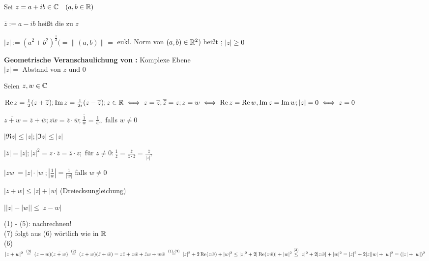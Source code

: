 \documentclass[a4paper,twoside,DIV15,BCOR12mm]{scrbook}
\begin{document}
\begin{definition}
Sei $z = a + ib \in \mathbb{C} \quad (a,b \in \mathbb{R})$\\
\begin{liste}
\item $\bar z := a - ib$ heißt die zu $z$  \\
\item $|z| := (a^2 + b^2)^{\frac{1}{2}} (=\|(a,b)\| =$ eukl. Norm von $(a,b) \in \mathbb{R} ^2$) heißt ; $|z|\geq 0$
\end{liste}
\textbf{Geometrische Veranschaulichung von \MdC :} Komplexe Ebene \\
$|z| =$ Abstand von $z$ und $0$
\end{definition}

\begin{satz}
Seien $z,w \in \mathbb{C}$\\
\begin{liste}
\item $\mathop{\rm Re}\nolimits z = \frac{1}{2}(z + \overline{z}); \mathop{\rm Im}\nolimits z = \frac{1}{2 i}(z-\overline{z}); z \in \mathbb{R} \iff z = \overline{z}; \overline{\bar z}=z; z=w \iff \mathop{\rm Re}\nolimits z = \mathop{\rm Re}\nolimits w, \mathop{\rm Im}\nolimits z = \mathop{\rm Im}\nolimits w; |z|=0 \iff z=0$
\item $\overline{z+w} = \overline{z} + \overline{w}; \overline{zw} = \overline{z} \cdot \overline{w}; \overline{\frac{1}{w}} = \frac{1}{\bar w}, $ falls $w \neq 0$
\item $| \Re z| \leq |z|; |\Im z| \leq |z|$
\item $|\bar z| = |z|; |z|^2 = z\cdot \bar z = \bar z \cdot z;$ für $z \neq 0 : \frac{1}{z} = \frac{\overline{z}}{z \cdot \overline{z}} = \frac{\overline{z} }{|z|^2}$
\item $|zw| = |z|\cdot |w|; |\frac{1}{w}| = \frac{1}{|w|}$ falls $w \neq 0$
\item $|z + w| \leq |z| + |w|$ \quad (Dreiecksungleichung)
\item $\big ||z|-|w|\big| \leq |z - w|$
\end{liste}
\end{satz}

\begin{beweis}
(1) - (5): nachrechnen! \\
(7) folgt aus (6) wörtlich wie in $\mathbb{R}$ \\
(6) $|z + w|^2 \gleichwegen{(3)} (z + w)(\bar {z+w}) \gleichwegen{(2)} (z+w)(\bar z + \bar w) = z \bar z + z \bar w + \bar z w + w \bar w \\
\gleichwegen{(1),(3)} |z| ^2 + 2\Re(z \bar w) + |w|^2 \leq |z|^2 + 2|\Re (z\bar w)| + |w|^2 \\
\stackrel{(3)}{\leq} |z|^2 + 2|z\bar w| + |w|^2 = |z|^2 + 2|z||w| + |w|^2 = (|z| + |w|)^2$
\end{beweis}
\end{document}
